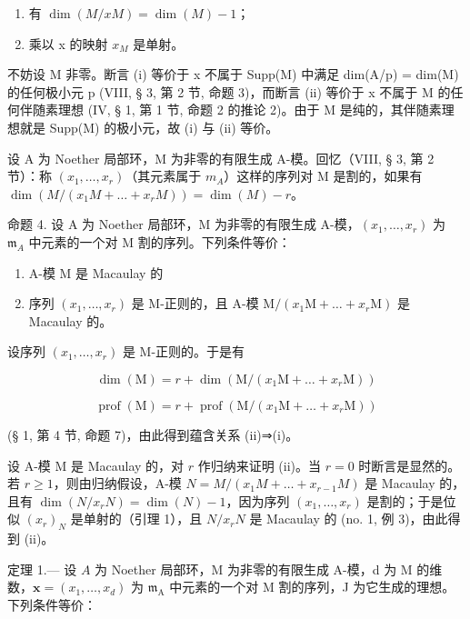 \begin{enumerate}
\def\labelenumi{(\roman{enumi})}
\item
  有 \(\dim(M/xM)=\dim(M)-1\)；
\item
  乘以 x 的映射 \(x_{M}\) 是单射。
\end{enumerate}

不妨设 M 非零。断言 (i) 等价于 x 不属于 Supp(M) 中满足 dim(A/p) = dim(M) 的任何极小元 p (VIII, § 3, 第 2 节, 命题 3)，而断言 (ii) 等价于 x 不属于 M 的任何伴随素理想 (IV, § 1, 第 1 节, 命题 2 的推论 2)。由于 M 是纯的，其伴随素理想就是 Supp(M) 的极小元，故 (i) 与 (ii) 等价。

设 A 为 Noether 局部环，M 为非零的有限生成 A-模。回忆（VIII, § 3, 第 2 节）：称 \((x_{1},\ldots,x_{r})\)（其元素属于 \(m_{A}\)）这样的序列对 M 是割的，如果有 \(\dim(M/(x_{1}M+\ldots+x_{r}M))=\dim(M)-r\)。

命题 4. 设 A 为 Noether 局部环，M 为非零的有限生成 A-模，\((x_{1},\ldots ,x_{r})\) 为 \(\mathfrak{m}_{A}\) 中元素的一个对 M 割的序列。下列条件等价：

\begin{enumerate}
\def\labelenumi{(\roman{enumi})}
\item
  A-模 M 是 Macaulay 的
\item
  序列 \((x_{1},\ldots,x_{r})\) 是 M-正则的，且 A-模 \(\mathrm{M}/(x_{1}\mathrm{M}+\ldots+x_{r}\mathrm{M})\) 是 Macaulay 的。
\end{enumerate}

设序列 \((x_{1},\ldots,x_{r})\) 是 M-正则的。于是有

\[
\dim (\mathrm{M}) = r + \dim (\mathrm{M} / (x _ {1} \mathrm{M} + \dots + x _ {r} \mathrm{M}))
\]

\[
\operatorname{prof} (\mathrm{M}) = r + \operatorname{prof} \left(\mathrm{M} / (x _ {1} \mathrm{M} + \dots + x _ {r} \mathrm{M})\right)
\]

(§ 1, 第 4 节, 命题 7)，由此得到蕴含关系 (ii)⇒(i)。

设 A-模 M 是 Macaulay 的，对 \(r\) 作归纳来证明 (ii)。当 \(r = 0\) 时断言是显然的。若 \(r \geqslant 1\)，则由归纳假设，A-模 \(N = M/(x_1M + \ldots + x_{r-1}M)\) 是 Macaulay 的，且有 \(\dim(N/x_rN) = \dim(N) - 1\)，因为序列 \((x_1, \ldots, x_r)\) 是割的；于是位似 \((x_r)_N\) 是单射的（引理 1），且 \(N/x_rN\) 是 Macaulay 的 (\(\mathrm{no.}\) 1, 例 3)，由此得到 (ii)。

定理 1.--- 设 \(A\) 为 Noether 局部环，M 为非零的有限生成 A-模，d 为 M 的维数，\(\mathbf{x} = (x_1, \ldots, x_d)\) 为 \(\mathfrak{m}_{\mathrm{A}}\) 中元素的一个对 M 割的序列，J 为它生成的理想。下列条件等价：

